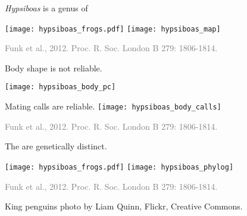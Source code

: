 \documentclass[t]{beamer}
\begin{document}
\begin{frame}[t]{\textit{Hypsiboas} is a genus of }
\centering
\begin{multicols}{2}
	\texttt{[image: hypsiboas\_frogs.pdf]}
	\vfill
	\columnbreak
	\texttt{[image: hypsiboas\_map]} \vfill
\end{multicols}
\vspace{5ex}
\hfill\Tiny\textcolor{gray}{Funk et al., 2012. Proc. R. Soc. London B 279: 1806-1814.}
\end{frame}



\begin{frame}{}
\vspace{1\baselineskip}
\begin{multicols}{2}
	Body shape is not reliable.\vspace{\baselineskip}
	
	\texttt{[image: hypsiboas\_body\_pc]}
	\columnbreak

	\pause
	Mating calls are reliable.\vspace{\baselineskip}
	\texttt{[image: hypsiboas\_body\_calls]}
	
\end{multicols}
\vspace{12ex}
\hfill\Tiny\textcolor{gray}{Funk et al., 2012. Proc. R. Soc. London B 279: 1806-1814.}
\end{frame}

\begin{frame}{The  are genetically distinct.}
	\centering
	\begin{multicols}{2}
		\texttt{[image: hypsiboas\_frogs.pdf]} \vfill
		\columnbreak
		\texttt{[image: hypsiboas\_phylog]} \vfill
	\end{multicols}
\vspace{-1ex}
\hfill\Tiny\textcolor{gray}{Funk et al., 2012. Proc. R. Soc. London B 279: 1806-1814.}
\end{frame}



{
\begin{frame}[b]
\Tiny\textcolor{gray!50!white}{King penguins photo by Liam Quinn, Flickr, Creative Commons.}

\end{frame}
}
\end{document}
